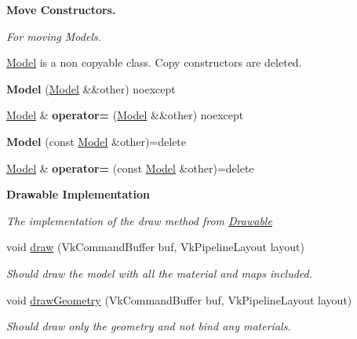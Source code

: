 \begin{Indent}\textbf{ Move Constructors.}\par
{\em For moving Models.

\hyperlink{classblaze_1_1Model}{Model} is a non copyable class. Copy constructors are deleted. }\begin{DoxyCompactItemize}
\item 
\mbox{\label{classblaze_1_1Model_a96de780b11dc77a85707b34a2ab684c3}} 
{\bfseries Model} (\hyperlink{classblaze_1_1Model}{Model} \&\&other) noexcept
\item 
\mbox{\label{classblaze_1_1Model_a45de45fd0522711e10029263f1194a6e}} 
\hyperlink{classblaze_1_1Model}{Model} \& {\bfseries operator=} (\hyperlink{classblaze_1_1Model}{Model} \&\&other) noexcept
\item 
\mbox{\label{classblaze_1_1Model_a4d3cc8751c4fad2581f98b53fb15641f}} 
{\bfseries Model} (const \hyperlink{classblaze_1_1Model}{Model} \&other)=delete
\item 
\mbox{\label{classblaze_1_1Model_ab7a55451c367564fde2c35190aa59b4d}} 
\hyperlink{classblaze_1_1Model}{Model} \& {\bfseries operator=} (const \hyperlink{classblaze_1_1Model}{Model} \&other)=delete
\end{DoxyCompactItemize}
\end{Indent}
\begin{Indent}\textbf{ Drawable Implementation}\par
{\em The implementation of the draw method from \hyperlink{classblaze_1_1Drawable}{Drawable} }\begin{DoxyCompactItemize}
\item 
void \hyperlink{classblaze_1_1Model_a00c3a74721bcad2d066de0c78313dae5}{draw} (Vk\+Command\+Buffer buf, Vk\+Pipeline\+Layout layout)
\begin{DoxyCompactList}\small\item\em Should draw the model with all the material and maps included. \end{DoxyCompactList}\item 
void \hyperlink{classblaze_1_1Model_ab5427d1b48ee3aedea9e405aa3892f5c}{draw\+Geometry} (Vk\+Command\+Buffer buf, Vk\+Pipeline\+Layout layout)
\begin{DoxyCompactList}\small\item\em Should draw only the geometry and not bind any materials. \end{DoxyCompactList}\end{DoxyCompactItemize}
\end{Indent}
